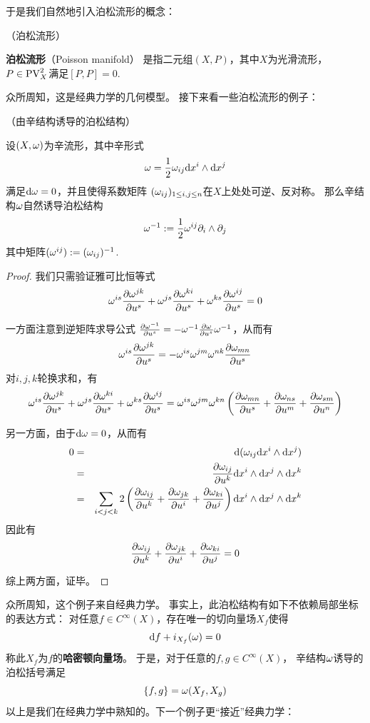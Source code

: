 于是我们自然地引入泊松流形的概念：

\begin{definition}（泊松流形）

\textbf{泊松流形}（Poisson manifold）
是指二元组$(X,P)$，其中$X$为光滑流形，
$P\in\operatorname{PV}^2_X$满足$[P,P]=0$.
\end{definition}
众所周知，这是经典力学的几何模型。
接下来看一些泊松流形的例子：

\begin{Example}（由辛结构诱导的泊松结构）

设$(X,\omega)$为辛流形，其中辛形式
$$\omega=\frac{1}{2}\omega_{ij}\mathrm{d} x^i\wedge\mathrm{d} x^{j}$$
满足$\mathrm{d}\omega=0$，并且使得系数矩阵
$(\omega_{ij})_{1\leq i,j\leq n}$在$X$上处处可逆、反对称。
那么辛结构$\omega$自然诱导泊松结构
$$\omega^{-1}:=\frac{1}{2}\omega^{ij}\partial_i\wedge\partial_j$$
其中矩阵$(\omega^{ij}):=(\omega_{ij})^{-1}$.
\end{Example}

\begin{proof}
我们只需验证雅可比恒等式
$$
  \omega^{is}\frac{\partial \omega^{jk}} {\partial u^s}
 +\omega^{js}\frac{\partial \omega^{ki}} {\partial u^s}
 +\omega^{ks}\frac{\partial \omega^{ij}} {\partial u^s}
=0
$$

一方面注意到逆矩阵求导公式
$\frac{\partial \omega^{-1}} {\partial u^s}=
-\omega^{-1}\frac{\partial \omega} {\partial u^s}\omega^{-1}$，从而有
$$\omega^{is}\frac{\partial \omega^{jk}} {\partial u^s}=-
\omega^{is}\omega^{jm}\omega^{nk}\frac{\partial \omega_{mn}} {\partial u^s}$$
对$i,j,k$轮换求和，有
$$
  \omega^{is}\frac{\partial \omega^{jk}} {\partial u^s}
 +\omega^{js}\frac{\partial \omega^{ki}} {\partial u^s}
 +\omega^{ks}\frac{\partial \omega^{ij}} {\partial u^s}
=
  \omega^{is}\omega^{jm}\omega^{kn}
  \left(
    \frac{\partial \omega_{mn}} {\partial u^s}
   +\frac{\partial \omega_{ns}} {\partial u^m}
   +\frac{\partial \omega_{sm}} {\partial u^n}
  \right)
$$

另一方面，由于$\mathrm{d}\omega=0$，从而有
\begin{eqnarray*}
     0
&=&
     \mathrm{d}(\omega_{ij}\mathrm{d} x^i\wedge\mathrm{d} x^j)\\
&=&
     \frac{\partial \omega_{ij}} {\partial u^k}\mathrm{d} x^i\wedge\mathrm{d} x^j\wedge\mathrm{d} x^k\\
&=&
     \sum_{i<j<k}
   2\left(
     \frac{\partial \omega_{ij}} {\partial u^k}
    +\frac{\partial \omega_{jk}} {\partial u^i}
    +\frac{\partial \omega_{ki}} {\partial u^j}
   \right)
   \mathrm{d} x^i\wedge\mathrm{d} x^j\wedge\mathrm{d} x^k
\end{eqnarray*}
因此有
$$\frac{\partial \omega_{ij}} {\partial u^k}
    +\frac{\partial \omega_{jk}} {\partial u^i}
    +\frac{\partial \omega_{ki}} {\partial u^j}=0$$

综上两方面，证毕。
\end{proof}
众所周知，这个例子来自经典力学。
事实上，此泊松结构有如下不依赖局部坐标的表达方式：
对任意$f\in C^{\infty}(X)$，存在唯一的切向量场$X_f$使得
$$\mathrm{d} f+i_{X_f}(\omega)=0$$
称此$X_f$为$f$的\textbf{哈密顿向量场}。
于是，对于任意的$f,g\in C^{\infty}(X)$，
辛结构$\omega$诱导的泊松括号满足
$$\{f,g\}=\omega(X_f,X_g)$$
以上是我们在经典力学中熟知的。下一个例子更“接近”经典力学：

